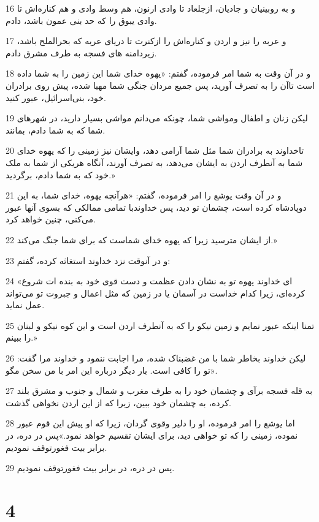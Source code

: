\par 16 و به روبینیان و جادیان، ازجلعاد تا وادی ارنون، هم وسط وادی و هم کناره‌اش تا وادی یبوق را که حد بنی عمون باشد، دادم.
\par 17 و عربه را نیز و اردن و کناره‌اش را ازکنرت تا دریای عربه که بحرالملح باشد، زیردامنه های فسجه به طرف مشرق دادم.
\par 18 و در آن وقت به شما امر فرموده، گفتم: «یهوه خدای شما این زمین را به شما داده است تاآن را به تصرف آورید، پس جمیع مردان جنگی شما مهیا شده، پیش روی برادران خود، بنی‌اسرائیل، عبور کنید.
\par 19 لیکن زنان و اطفال ومواشی شما، چونکه می‌دانم مواشی بسیار دارید، در شهرهای شما که به شما دادم، بمانند.
\par 20 تاخداوند به برادران شما مثل شما آرامی دهد، وایشان نیز زمینی را که یهوه خدای شما به آنطرف اردن به ایشان می‌دهد، به تصرف آورند، آنگاه هریکی از شما به ملک خود که به شما دادم، برگردید.»
\par 21 و در آن وقت یوشع را امر فرموده، گفتم: «هرآنچه یهوه، خدای شما، به این دوپادشاه کرده است، چشمان تو دید، پس خداوندبا تمامی ممالکی که بسوی آنها عبور می‌کنی، چنین خواهد کرد.
\par 22 از ایشان مترسید زیرا که یهوه خدای شماست که برای شما جنگ می‌کند.»
\par 23 و در آنوقت نزد خداوند استغاثه کرده، گفتم:
\par 24 «ای خداوند یهوه تو به نشان دادن عظمت و دست قوی خود به بنده ات شروع کرده‌ای، زیرا کدام خداست در آسمان یا در زمین که مثل اعمال و جبروت تو می‌تواند عمل نماید.
\par 25 تمنا اینکه عبور نمایم و زمین نیکو را که به آنطرف اردن است و این کوه نیکو و لبنان را ببینم.»
\par 26 لیکن خداوند بخاطر شما با من غضبناک شده، مرا اجابت ننمود و خداوند مرا گفت: «تو را کافی است. بار دیگر درباره این امر با من سخن مگو.
\par 27 به قله فسجه برآی و چشمان خود را به طرف مغرب و شمال و جنوب و مشرق بلند کرده، به چشمان خود ببین، زیرا که از این اردن نخواهی گذشت.
\par 28 اما یوشع را امر فرموده، او را دلیر وقوی گردان، زیرا که او پیش این قوم عبور نموده، زمینی را که تو خواهی دید، برای ایشان تقسیم خواهد نمود.»پس در دره، در برابر بیت فغورتوقف نمودیم.
\par 29 پس در دره، در برابر بیت فغورتوقف نمودیم.
 
\chapter{4}

